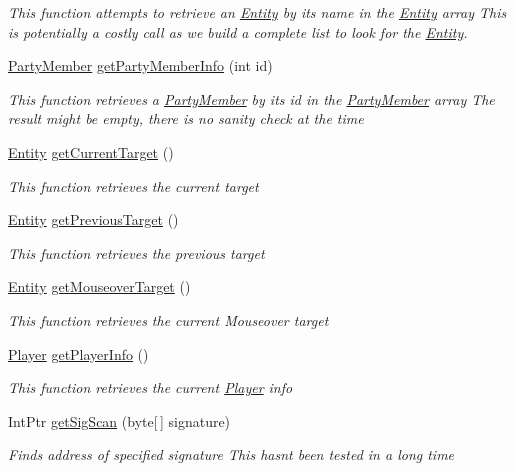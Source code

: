 \begin{DoxyCompactItemize}
\begin{DoxyCompactList}\small\item\em This function attempts to retrieve an \hyperlink{classffxivlib_1_1_entity}{Entity} by its name in the \hyperlink{classffxivlib_1_1_entity}{Entity} array This is potentially a costly call as we build a complete list to look for the \hyperlink{classffxivlib_1_1_entity}{Entity}. \end{DoxyCompactList}\item 
\hyperlink{classffxivlib_1_1_party_member}{Party\-Member} \hyperlink{classffxivlib_1_1_f_f_x_i_v_l_i_b_a8cd7985eb9beb13c092ae1ed5f21c9f8}{get\-Party\-Member\-Info} (int id)
\begin{DoxyCompactList}\small\item\em This function retrieves a \hyperlink{classffxivlib_1_1_party_member}{Party\-Member} by its id in the \hyperlink{classffxivlib_1_1_party_member}{Party\-Member} array The result might be empty, there is no sanity check at the time \end{DoxyCompactList}\item 
\hyperlink{classffxivlib_1_1_entity}{Entity} \hyperlink{classffxivlib_1_1_f_f_x_i_v_l_i_b_aee1b206ae927123785f8362b4761aec3}{get\-Current\-Target} ()
\begin{DoxyCompactList}\small\item\em This function retrieves the current target \end{DoxyCompactList}\item 
\hyperlink{classffxivlib_1_1_entity}{Entity} \hyperlink{classffxivlib_1_1_f_f_x_i_v_l_i_b_a7a8097d470f118e59855c48528bd67bb}{get\-Previous\-Target} ()
\begin{DoxyCompactList}\small\item\em This function retrieves the previous target \end{DoxyCompactList}\item 
\hyperlink{classffxivlib_1_1_entity}{Entity} \hyperlink{classffxivlib_1_1_f_f_x_i_v_l_i_b_ae778171978d95c2cb4a3519e2cc9761a}{get\-Mouseover\-Target} ()
\begin{DoxyCompactList}\small\item\em This function retrieves the current Mouseover target \end{DoxyCompactList}\item 
\hyperlink{classffxivlib_1_1_player}{Player} \hyperlink{classffxivlib_1_1_f_f_x_i_v_l_i_b_aaf42ae8d84f170a0f18207369fb8e1a9}{get\-Player\-Info} ()
\begin{DoxyCompactList}\small\item\em This function retrieves the current \hyperlink{classffxivlib_1_1_player}{Player} info \end{DoxyCompactList}\item 
Int\-Ptr \hyperlink{classffxivlib_1_1_f_f_x_i_v_l_i_b_a532f7bcc0371915d2bbd74e6fdaf47ae}{get\-Sig\-Scan} (byte\mbox{[}$\,$\mbox{]} signature)
\begin{DoxyCompactList}\small\item\em Finds address of specified signature This hasnt been tested in a long time \end{DoxyCompactList}\end{DoxyCompactItemize}


